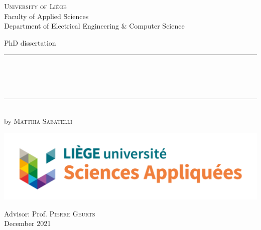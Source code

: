 
\begin{titlepage}
	\begin{addmargin}[-1cm]{-3cm}
    \begin{center}
        \large
        {\Large \textsc{University of Li{\`e}ge}}\\[1ex]
        Faculty of Applied Sciences\\
        Department of Electrical Engineering \& Computer Science\\

        \vfill

        PhD dissertation\\ \vskip1cm
        \rule{14cm}{0.4pt}\\ \bigskip
        \begingroup
            \Large
            \color{Maroon}\spacedallcaps{\myTitle} \\ \bigskip
        \endgroup
        \spacedlowsmallcaps{\mySubtitle} \\ \bigskip
        \rule{14cm}{0.4pt}\\ \vskip1cm
        by \textsc{Matthia Sabatelli}

        \vfill

	\includegraphics[width=1\textwidth]{Images/new_logo}

        \vfill

        \hfill Advisor: Prof. \textsc{Pierre Geurts}\\
        \hfill December 2021
    \end{center}
  \end{addmargin}
\end{titlepage}
